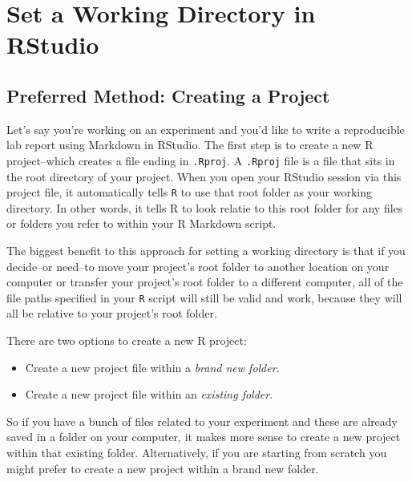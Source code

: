 \documentclass[
]{book}
\providecommand{\tightlist}{%
  \setlength{\itemsep}{0pt}\setlength{\parskip}{0pt}}
\begin{document}
\hypertarget{set-a-working-directory-in-rstudio}{%
\section{Set a Working Directory in RStudio}\label{set-a-working-directory-in-rstudio}}

\hypertarget{preferred-method-creating-a-project}{%
\subsection*{Preferred Method: Creating a Project}\label{preferred-method-creating-a-project}}

Let's say you're working on an experiment and you'd like to write a reproducible lab report using Markdown in RStudio. The first step is to create a new R project--which creates a file ending in \texttt{.Rproj}. A \texttt{.Rproj} file is a file that sits in the root directory of your project. When you open your RStudio session via this project file, it automatically tells \texttt{R} to use that root folder as your working directory. In other words, it tells R to look relatie to this root folder for any files or folders you refer to within your R Markdown script.

The biggest benefit to this approach for setting a working directory is that if you decide--or need--to move your project's root folder to another location on your computer or transfer your project's root folder to a different computer, all of the file paths specified in your \texttt{R} script will still be valid and work, because they will all be relative to your project's root folder.

There are two options to create a new R project:

\begin{itemize}
\tightlist
\item
  Create a new project file within a \emph{brand new folder}.
\item
  Create a new project file within an \emph{existing folder}.
\end{itemize}

So if you have a bunch of files related to your experiment and these are already saved in a folder on your computer, it makes more sense to create a new project within that existing folder. Alternatively, if you are starting from scratch you might prefer to create a new project within a brand new folder.
\end{document}
